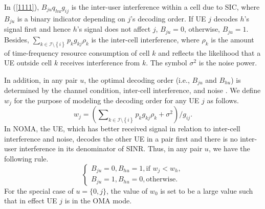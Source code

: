 \documentclass[10pt,journal,final,finalsubmission,twocolumn]{IEEEtran}
\begin{document}
In (\ref{1111}), $B_{ju}q_{hu}g_{ij}$ is the inter-user interference within a cell due to SIC, where $B_{ju}$ is a binary indicator depending on $j$'s decoding order. If UE $j$ decodes $h$'s signal first and hence $h$'s signal does not affect $j$, $B_{ju} = 0$, otherwise, $B_{ju} = 1$. Besides, ${\sum_{k\in \mathcal{I}\setminus \left \{ i \right \}}p_kg_{kj}\rho_k}$ is the inter-cell interference, where $\rho_k$ is the amount of time-frequency resource consumption of cell $k$ and reflects the likelihood that a UE outside cell $k$ receives interference from $k$. The symbol $\sigma^2$ is the noise power.

In addition, in any pair $u$, the optimal decoding order (i.e., $B_{ju}$ and $B_{hu}$) is determined by the channel condition, inter-cell interference, and noise \cite{41}. We define $w_j$ for the purpose of modeling the decoding order for any UE $j$ as follows. 
\begin{equation}
w_j=  \left(\sum \nolimits_{k \in \mathcal{I}\setminus \left \{ i \right \} }p_k g_{kj}\rho_k+\sigma ^2   \right) / g_{ij} .
\end{equation}
In NOMA, the UE, which has better received signal in relation to inter-cell interference and noise, decodes the other UE in a pair first and there is no inter-user interference in its denominator of SINR. Thus, in any pair $u$, we have the following rule. 
\begin{equation}\label{rule}
\left\{\begin{array}{l}
B_{ju} = 0,B_{hu} =1, \text{if } w_j < w_h,\\
B_{ju} = 1,B_{hu} =0, \text{otherwise}.
\end{array}\right.
\end{equation}
For the special case of $u = \{0, j\}$, the value of $w_0$ is set to be a large value such that in effect UE $j$ is in the OMA mode.
\end{document}
